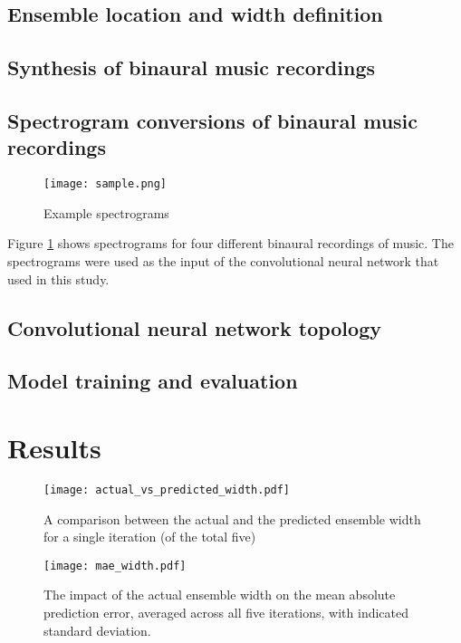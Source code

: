 \documentclass{article}
\begin{document}
\subsection{Ensemble location and width definition}
\subsection{Synthesis of binaural music recordings}
\subsection{Spectrogram conversions of binaural music recordings}

\begin{figure}
\centering
\texttt{[image: sample.png]}
\caption{\label{fig:sample}Example spectrograms}
\end{figure}



Figure \ref{fig:sample} shows spectrograms for four different binaural recordings of music. The spectrograms were used as the input of the convolutional neural network that used in this study.

\subsection{Convolutional neural network topology}
\subsection{Model training and evaluation}
\section{Results}

\begin{figure}[ht]
  \centering
  \begin{minipage}[t]{0.45\linewidth}
    \texttt{[image: actual\_vs\_predicted\_width.pdf]}
    \caption{\label{fig:actual_vs_predicted_width}A comparison between the actual and the predicted ensemble width for a single iteration (of the total five) }
  \end{minipage}
  \hspace{0.5cm} 
  \begin{minipage}[t]{0.45\linewidth}
    \texttt{[image: mae\_width.pdf]}
    \caption{\label{fig:mae_width}The impact of the actual ensemble width on the mean absolute prediction error, averaged across all five iterations, with indicated standard deviation.}
  \end{minipage}
\end{figure}
\end{document}
